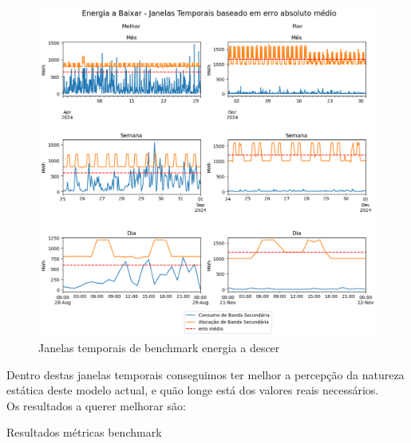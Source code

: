 \begin{figure}[H]
    \centering
    \includegraphics[width=\textwidth]{plots/alocacoes_temporais_downward_dataset.png}
    \caption{Janelas temporais de benchmark energia a descer}
    \label{fig:benchmarktimewindowsdown}
\end{figure}

Dentro destas janelas temporais conseguimos ter melhor a percepção da natureza estática deste modelo actual, e quão longe está dos valores reais necessários.\\

Os resultados a querer melhorar são:\\
\begin{table}[H]
    \caption{Resultados métricas benchmark}    
    \resizebox{\linewidth}{!}{}
    \label{tab:benchmarkmetrics}
    \end{table}
